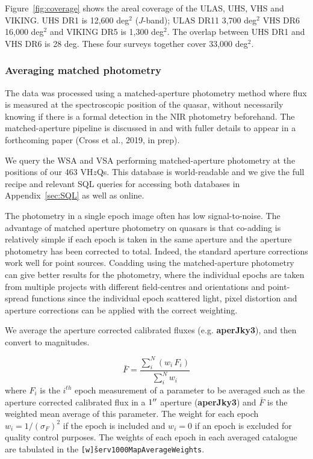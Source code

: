 \documentclass[usenatbib]{mnras}
\begin{document}
Figure~\ref{fig:coverage} shows the areal coverage of the ULAS, UHS,
VHS and VIKING. UHS DR1 is 12,600 deg$^{2}$ ($J$-band); ULAS DR11
3,700 deg$^{2}$ VHS DR6 16,000 deg$^{2}$ and VIKING DR5 is 1,300
deg$^{2}$. The overlap between UHS DR1 and VHS DR6 is 28 deg. These
four surveys together cover 33,000 deg$^{2}$.

  \subsubsection{Averaging matched photometry}
  The data was processed using a matched-aperture photometry method
  where flux is measured at the spectroscopic position of the quasar,
  without necessarily knowing if there is a formal detection in the NIR
  photometry beforehand. The matched-aperture pipeline is discussed in
  \citet{Cross2013} and with fuller details to appear in a forthcoming
  paper (Cross et al., 2019, in prep).
  
  We query the WSA and VSA performing matched-aperture photometry at
  the positions of our 463 VH$z$Qs. This database is world-readable and
  we give the full recipe and relevant SQL queries for accessing both
  databases in Appendix~\ref{sec:SQL} as well as online. 
  
  The photometry in a single epoch image often has low
  signal-to-noise.  The advantage of matched aperture photometry on
  quasars is that co-adding is relatively simple if each epoch is taken
  in the same aperture and the aperture photometry has been corrected to
  total. Indeed, the standard aperture corrections work well for point
  sources. Coadding using the matched-aperture photometry can give better results for the photometry, 
  where the individual epochs are taken from multiple projects with different field-centres and orientations and point-spread functions since the individual epoch scattered light, pixel distortion and aperture corrections can be applied with the correct weighting.
   
  We average the aperture corrected calibrated fluxes (e.g. {\bf
  aperJky3}), and then convert to magnitudes. 

  \begin{equation}
    \bar{F} = \frac{\sum_i^N (w_i\,F_i)}{\sum_i^N w_i}  
    \label{eq:avg}
  \end{equation}
  where $F_i$ is the $i^{th}$ epoch measurement of a parameter to be
  averaged such as the aperture corrected calibrated flux in a $1\hbox{$^{\prime\prime}$}$ aperture
  ({\bf aperJky3}) and $\bar{F}$ is the weighted mean average of this parameter.
  The weight for each epoch $w_i=1/(\sigma_{F})^2$ if the epoch is included and 
  $w_i=0$ if an epoch is excluded for quality control purposes. The weights of each epoch in each averaged catalogue are tabulated in the {\tt [w\v]serv1000MapAverageWeights}.
   
\end{document}
